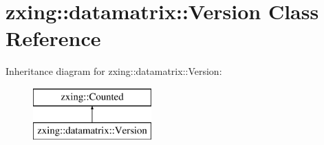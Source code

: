 \hypertarget{classzxing_1_1datamatrix_1_1_version}{}\section{zxing\+:\+:datamatrix\+:\+:Version Class Reference}
\label{classzxing_1_1datamatrix_1_1_version}
Inheritance diagram for zxing\+:\+:datamatrix\+:\+:Version\+:\begin{figure}[H]
\begin{center}
\leavevmode
\includegraphics[height=2.000000cm]{classzxing_1_1datamatrix_1_1_version}
\end{center}
\end{figure}
